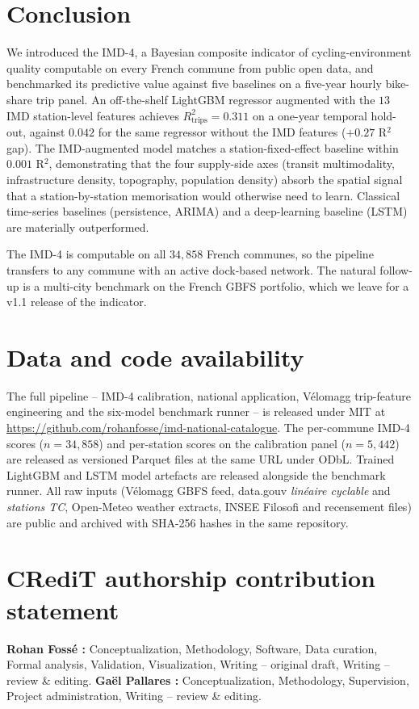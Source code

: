 \documentclass[11pt,a4paper]{article}
\begin{document}
\section{Conclusion}
\label{sec:conclusion}

We introduced the IMD-4, a Bayesian composite indicator of
cycling-environment quality computable on every French commune
from public open data, and benchmarked its predictive value
against five baselines on a five-year hourly bike-share trip
panel.  An off-the-shelf LightGBM regressor augmented with the
$13$ IMD station-level features achieves
$R^{2}_{\text{trips}} = 0.311$ on a one-year temporal hold-out,
against $0.042$ for the same regressor without the IMD features
($+0.27$ R$^2$ gap).  The IMD-augmented model matches a
station-fixed-effect baseline within $0.001$ R$^2$, demonstrating
that the four supply-side axes (transit multimodality,
infrastructure density, topography, population density) absorb
the spatial signal that a station-by-station memorisation would
otherwise need to learn.  Classical time-series baselines
(persistence, ARIMA) and a deep-learning baseline (LSTM) are
materially outperformed.

The IMD-4 is computable on all $34{,}858$ French communes, so the
pipeline transfers to any commune with an active dock-based
network.  The natural follow-up is a multi-city benchmark on the
French GBFS portfolio, which we leave for a v1.1 release of the
indicator.

\section*{Data and code availability}

The full pipeline -- IMD-4 calibration, national application,
V\'elomagg trip-feature engineering and the six-model benchmark
runner -- is released under MIT at
\url{https://github.com/rohanfosse/imd-national-catalogue}.  The
per-commune IMD-4 scores ($n = 34{,}858$) and per-station scores
on the calibration panel ($n = 5{,}442$) are released as
versioned Parquet files at the same URL under ODbL.  Trained
LightGBM and LSTM model artefacts are released alongside the
benchmark runner.  All raw inputs (V\'elomagg GBFS feed,
data.gouv \emph{lin\'eaire cyclable} and \emph{stations TC},
Open-Meteo weather extracts, INSEE Filosofi and recensement
files) are public and archived with SHA-256 hashes in the same
repository.

\section*{CRediT authorship contribution statement}
\textbf{Rohan Foss\'e :} Conceptualization, Methodology,
Software, Data curation, Formal analysis, Validation,
Visualization, Writing -- original draft, Writing -- review \&
editing.
\textbf{Ga\"el Pallares :} Conceptualization, Methodology,
Supervision, Project administration, Writing -- review \&
editing.
\end{document}
